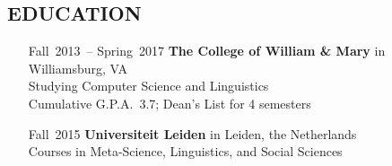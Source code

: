 \documentclass{res}     %
\begin{document}
\begin{resume}

\section{EDUCATION}
\vspace{5mm}
\begin{itemize}[font=\itshape,align=parleft,labelwidth=3cm,leftmargin=2cm]
    \item[Fall~2013~-- Spring~2017]
        \textbf{The College of William \& Mary} in Williamsburg, VA
        \\ Studying
        Computer Science and Linguistics %
        \\ Cumulative G.P.A.\ 3.7; Dean's List for 4 semesters
    \item[Fall~2015]
        \textbf{Universiteit Leiden} in Leiden, the Netherlands
        \\ Courses in
        Meta-Science, Linguistics, and Social Sciences %
\end{itemize}


\end{resume}
\end{document}
